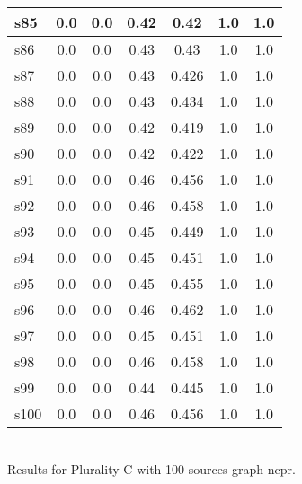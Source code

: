 \documentclass{article}
\begin{document}
\begin{tabular}{|l|c|c|c|c|c|c|}
\hline
s85 &0.0 & 0.0 & 0.42 & 0.42 & 1.0 & 1.0\\
\hline
s86 &0.0 & 0.0 & 0.43 & 0.43 & 1.0 & 1.0\\
\hline
s87 &0.0 & 0.0 & 0.43 & 0.426 & 1.0 & 1.0\\
\hline
s88 &0.0 & 0.0 & 0.43 & 0.434 & 1.0 & 1.0\\
\hline
s89 &0.0 & 0.0 & 0.42 & 0.419 & 1.0 & 1.0\\
\hline
s90 &0.0 & 0.0 & 0.42 & 0.422 & 1.0 & 1.0\\
\hline
s91 &0.0 & 0.0 & 0.46 & 0.456 & 1.0 & 1.0\\
\hline
s92 &0.0 & 0.0 & 0.46 & 0.458 & 1.0 & 1.0\\
\hline
s93 &0.0 & 0.0 & 0.45 & 0.449 & 1.0 & 1.0\\
\hline
s94 &0.0 & 0.0 & 0.45 & 0.451 & 1.0 & 1.0\\
\hline
s95 &0.0 & 0.0 & 0.45 & 0.455 & 1.0 & 1.0\\
\hline
s96 &0.0 & 0.0 & 0.46 & 0.462 & 1.0 & 1.0\\
\hline
s97 &0.0 & 0.0 & 0.45 & 0.451 & 1.0 & 1.0\\
\hline
s98 &0.0 & 0.0 & 0.46 & 0.458 & 1.0 & 1.0\\
\hline
s99 &0.0 & 0.0 & 0.44 & 0.445 & 1.0 & 1.0\\
\hline
s100 &0.0 & 0.0 & 0.46 & 0.456 & 1.0 & 1.0\\
\hline
\end{tabular}\\

\noindent Results for Plurality C with 100 sources graph ncpr.
\end{document}
